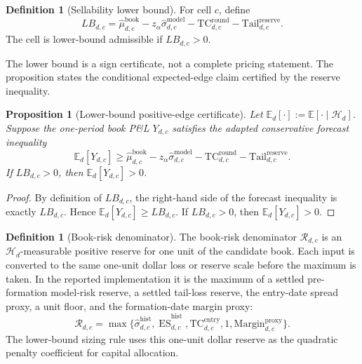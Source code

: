 \documentclass[11pt,a4paper]{amsart}
\theoremstyle{plain}
\newtheorem{proposition}[theorem]{Proposition}
\theoremstyle{definition}
\newtheorem{definition}[theorem]{Definition}
\theoremstyle{remark}
\newcommand{\EE}{\mathbb{E}}
\newcommand{\cH}{\mathcal{H}}
\newcommand{\ES}{\operatorname{ES}}
\begin{document}
\begin{definition}[Sellability lower bound]\label{def:sellability-lb}
For cell \(c\), define
\[
        LB_{d,c}
        =
        \widehat\mu_{d,c}^{\mathrm{book}}
        -z_\alpha\widehat\sigma_{d,c}^{\mathrm{model}}
        -\mathrm{TC}_{d,c}^{\mathrm{round}}
        -\mathrm{Tail}_{d,c}^{\mathrm{reserve}}.
\]
The cell is lower-bound admissible if \(LB_{d,c}>0\).
\end{definition}

The lower bound is a sign certificate, not a complete pricing statement.  The proposition states
the conditional expected-edge claim certified by the reserve inequality.

\begin{proposition}[Lower-bound positive-edge certificate]\label{prop:lb-certificate}
Let \(\EE_d[\cdot]:=\EE[\cdot\mid\cH_d]\).
Suppose the one-period book P\&L \(Y_{d,c}\) satisfies the adapted conservative forecast inequality
\[
        \EE_d[Y_{d,c}]
        \ge
        \widehat\mu_{d,c}^{\mathrm{book}}
        -z_\alpha\widehat\sigma_{d,c}^{\mathrm{model}}
        -\mathrm{TC}_{d,c}^{\mathrm{round}}
        -\mathrm{Tail}_{d,c}^{\mathrm{reserve}}.
\]
If \(LB_{d,c}>0\), then \(\EE_d[Y_{d,c}]>0\).
\end{proposition}

\begin{proof}
By definition of \(LB_{d,c}\), the right-hand side of the forecast inequality is exactly
\(LB_{d,c}\).  Hence \(\EE_d[Y_{d,c}]\ge LB_{d,c}\).  If \(LB_{d,c}>0\), then
\(\EE_d[Y_{d,c}]>0\).
\end{proof}

\begin{definition}[Book-risk denominator]\label{def:book-risk-denominator}
The book-risk denominator \(\mathcal R_{d,c}\) is an \(\cH_d\)-measurable positive reserve for one
unit of the candidate book.  Each input is converted to the same one-unit dollar loss or reserve
scale before the maximum is taken.  In the reported implementation it is the maximum of a settled
pre-formation model-risk reserve, a settled tail-loss reserve, the entry-date spread proxy, a unit
floor, and the formation-date margin proxy:
\[
        \mathcal R_{d,c}
        =
        \max\{
        \widehat\sigma^{\mathrm{hist}}_{d,c},
        \widehat{\ES}^{\mathrm{hist}}_{d,c},
        \mathrm{TC}^{\mathrm{entry}}_{d,c},
        1,
        \mathrm{Margin}^{\mathrm{proxy}}_{d,c}
        \}.
\]
The lower-bound sizing rule uses this one-unit dollar reserve as the quadratic penalty coefficient
for capital allocation.
\end{definition}
\end{document}
